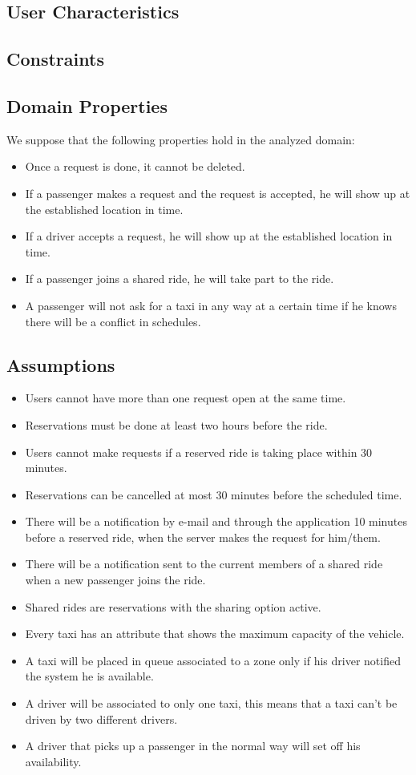 \subsection{User Characteristics}

\subsection{Constraints}

\subsection{Domain Properties}
We suppose that the following properties hold in the analyzed domain:
	\begin{itemize}
		\item Once a request is done, it cannot be deleted.
		\item If a passenger makes a request and the request is accepted, he will show up at the established location in time.
		\item If a driver accepts a request, he will show up at the established location in time.
		\item If a passenger joins a shared ride, he will take part to the ride.
		\item A passenger will not ask for a taxi in any way at a certain time if he knows there will be a conflict in schedules.
	\end{itemize}
	
\subsection{Assumptions}
	\begin{itemize}
		\item Users cannot have more than one request open at the same time.
		\item Reservations must be done at least two hours before the ride.
		\item Users cannot make requests if a reserved ride is taking place within 30 minutes.
		\item Reservations can be cancelled at most 30 minutes before the scheduled time.
		\item There will be a notification by e-mail and through the application 10 minutes before a reserved ride, when the server makes the request for him/them.
		\item There will be a notification sent to  the current members of a shared ride when a new passenger joins the ride.
		\item Shared rides are reservations with the sharing option active.
		\item Every taxi has an attribute that shows the maximum capacity of the vehicle.
		\item A taxi will be placed in queue associated to a zone only if his driver notified the system he is available.
		\item A driver will be associated to only one taxi, this means that a taxi can't be driven by two different drivers.
		\item A driver that picks up a passenger in the normal way will set off his availability.
	\end{itemize}

			